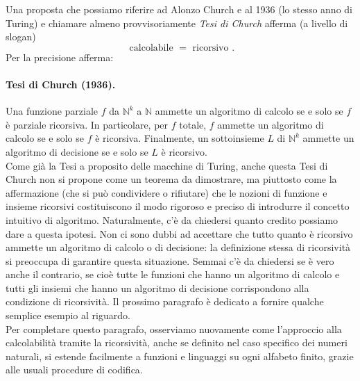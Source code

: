 Una proposta che possiamo riferire ad Alonzo Church e al 1936 (lo stesso anno di
Turing) e chiamare almeno provvisoriamente \textit{Tesi di Church} afferma (a livello di
slogan)
$$
    \text { calcolabile }=\text { ricorsivo } .
$$
Per la precisione afferma:

\paragraph{Tesi di Church (1936).} Una funzione parziale $f$ da
$\mathbb{N}^{k}$ a $\mathbb{N}$ ammette un algoritmo di calcolo se e solo se
$f$ è parziale ricorsiva. In particolare, per $f$ totale, $f$ ammette un
algoritmo di calcolo se e solo se $f$ è ricorsiva. Finalmente, un sottoinsieme
$L$ di $\mathbb{N}^k$ ammette un algoritmo di decisione se e solo se $L$ è
ricorsivo.\\

Come già la Tesi a proposito delle macchine di Turing, anche questa Tesi di
Church non si propone come un teorema da dimostrare, ma piuttosto come la
affermazione (che si può condividere o rifiutare) che le nozioni di funzione e
insieme ricorsivi costituiscono il modo rigoroso e preciso di introdurre il
concetto intuitivo di algoritmo. Naturalmente, c'è da chiedersi quanto credito
possiamo dare a questa ipotesi. Non ci sono dubbi ad accettare che tutto quanto
è ricorsivo ammette un algoritmo di calcolo o di decisione: la definizione
stessa di ricorsività si preoccupa di garantire questa situazione. Semmai c'è da
chiedersi se è vero anche il contrario, se cioè tutte le funzioni che hanno un
algoritmo di calcolo e tutti gli insiemi che hanno un algoritmo di decisione
corrispondono alla condizione di ricorsività. Il prossimo paragrafo è dedicato a
fornire qualche semplice esempio al riguardo.\\
Per completare questo paragrafo,
osserviamo nuovamente come l'approccio alla calcolabilità tramite la
ricorsività, anche se definito nel caso specifico dei numeri naturali, si
estende facilmente a funzioni e linguaggi su ogni alfabeto finito, grazie alle
usuali procedure di codifica.
